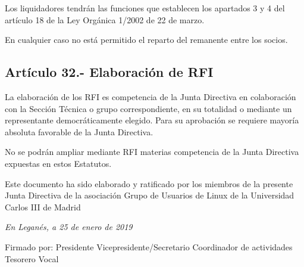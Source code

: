 \documentclass[10pt, spanish, pdftex]{gulplantilla}
\begin{document}
Los liquidadores tendrán las funciones que establecen los apartados 3 y 4 del artículo 18 de la Ley Orgánica 1/2002 de 22 de marzo.

En cualquier caso no está permitido el reparto del remanente entre los socios.

\subsection{Artículo 32.- Elaboración de RFI}
La elaboración de los RFI es competencia de la Junta Directiva en colaboración con la Sección Técnica o grupo correspondiente, en su totalidad o mediante un representante democráticamente elegido.
Para su aprobación se requiere mayoría absoluta favorable de la Junta Directiva.

No se podrán ampliar mediante RFI materias competencia de la Junta Directiva expuestas en estos Estatutos.

\newpage {}
Este documento ha sido elaborado y ratificado por los miembros de la presente Junta Directiva de la asociación Grupo de Usuarios de Linux de la Universidad Carlos III de Madrid
\newline
\begin{center}
\textit{En Leganés, a 25 de enero de 2019}
\end{center}
Firmado por:
\newline\newline\newline
Presidente
\newline\newline\newline\newline\newline
Vicepresidente/Secretario
\newline\newline\newline\newline\newline
Coordinador de actividades
\newline\newline\newline\newline\newline
Tesorero
\newline\newline\newline\newline\newline
Vocal
\end{document}
